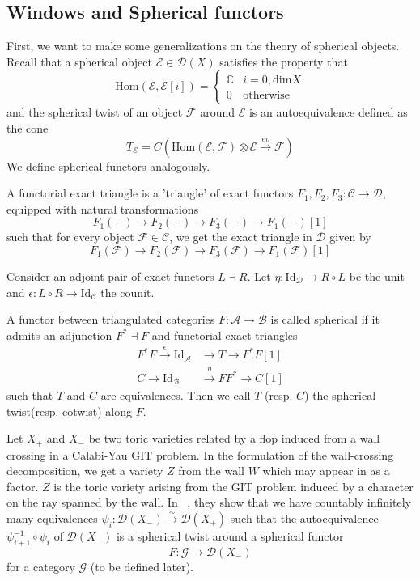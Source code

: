 \subsection{Windows and Spherical functors}

First, we want to make some generalizations on the theory of spherical objects. Recall that a spherical object $\mathcal{E} \in \mathcal{D}(X)$ satisfies the property that $$\mathrm{Hom}(\mathcal{E}, \mathcal{E}[i])= \begin{cases}
\mathbb{C} & i=0,\mathrm{dim}X  \\
0 & \text{otherwise}
\end{cases}$$
and the spherical twist of an object $\mathcal{F}$ around $\mathcal{E}$ is an autoequivalence defined as the cone $$T_\mathcal{E} = C(\mathrm{Hom}(\mathcal{E},\mathcal{F})\otimes \mathcal{E}\xrightarrow{ev} \mathcal{F})$$
We define spherical functors analogously.

\begin{definition}{}{}
	A functorial exact triangle is a 'triangle' of exact functors $F_{1}, F_{2}, F_{3} : \mathcal{C}\to \mathcal{D}$,    equipped with natural transformations $$
F_{1}(-)\to F_{2}(-)\to F_{3}(-)\to F_{1}(-)[1]
$$ such that for every object $\mathcal{F}\in \mathcal{C}$,   we get the exact triangle in $\mathcal{D}$ given by $$
F_{1}(\mathcal{F})\to F_{2}(\mathcal{F})\to F_{3}(\mathcal{F})\to F_{1}(\mathcal{F})[1]
$$
\end{definition}

Consider an adjoint pair of exact functors $L \dashv R$. Let $\eta : \mathrm{Id}_\mathcal{D}\to R\circ L$ be the unit and $\epsilon : L\circ R \to \mathrm{Id}_\mathcal{C}$ the counit. 

\begin{definition}{}{}
A functor between triangulated categories $F: \mathcal{A}\to \mathcal{B}$ is called spherical if it admits an adjunction $F^{*}\dashv F$ and  functorial exact triangles 
\begin{align*}
F^{*}F \xrightarrow{\epsilon} \mathrm{Id}_\mathcal{A}&\to T \to F^{*}F [1] \\
C\to \mathrm{Id}_\mathcal{B}&\xrightarrow{\eta} F F^{*}\to C[1]
\end{align*} such that $T$ and $C$ are equivalences. Then we call $T$ (resp. $C$) the spherical twist(resp. cotwist) along $F$. 
\end{definition}

Let $X_+$ and $X_-$ be two toric varieties related by a flop induced from a wall crossing in a Calabi-Yau GIT problem. In the formulation of the wall-crossing decomposition, we get a variety $Z$ from the wall $W$ which may appear in as a factor. $Z$ is the toric variety arising from the GIT problem induced by a character on the ray spanned by the wall. In ~\cite{halpernleistner2016autoequivalences}, they show that we have countably infinitely many equivalences $\psi_{i}: \mathcal{D}(X_{-})\xrightarrow{\sim} \mathcal{D}(X_{+})$  such that the autoequivalence $\psi_{i+1}^{-1}\circ \psi_i$ of $\mathcal{D}(X_{-})$ is a spherical twist around a spherical functor $$F : \mathcal{G}\to \mathcal{D}(X_{-})$$ for a category $\mathcal{G}$ (to be defined later).

